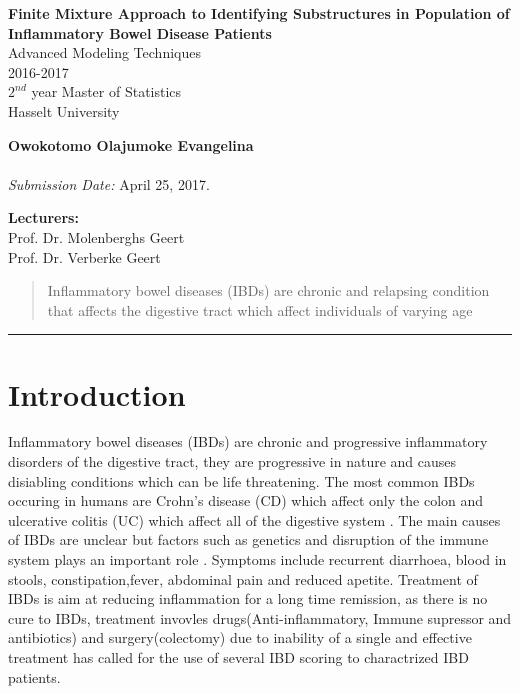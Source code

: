 \documentclass[11pt]{article}\usepackage[]{graphicx}\usepackage[]{color}
\begin{document}
\clearpage\thispagestyle{empty}

\begin{center}
	\textbf{\huge{Finite Mixture Approach to Identifying Substructures in Population of Inflammatory Bowel Disease Patients}} \\[1.7cm]
	\Large{
	Advanced Modeling Techniques\\
	2016-2017 \\[0.5cm]
	$2^{nd}$ year Master of Statistics \\
	Hasselt University	
	}
\end{center}

\vspace*{3cm}

\textbf{\large{Owokotomo Olajumoke Evangelina}}\\
 \\[2.5cm]

\noindent\textit{Submission Date:} April 25, 2017.

\vspace*{3cm}
\textbf{\large{Lecturers:}}\\
Prof. Dr. Molenberghs Geert  \\
Prof. Dr.  Verberke Geert


\newpage \setcounter{page}{1}

\begin{abstract}
Inflammatory bowel diseases (IBDs) are chronic and relapsing condition that affects the digestive tract which affect individuals of varying age
\end{abstract}
\rule{\textwidth}{0.4pt}

\newpage
\section*{Introduction}\label{introduction}
Inflammatory bowel diseases (IBDs) are chronic and progressive inflammatory disorders of the digestive tract, they are progressive in nature and causes disiabling conditions which can be life threatening. The most common IBDs occuring in humans are Crohn's disease (CD) which affect only the colon and ulcerative colitis (UC) which  affect all of the digestive system \cite{bib1}. The main causes of IBDs are unclear but factors such as genetics and disruption of the immune system plays an important role \cite{bib2}. Symptoms include recurrent diarrhoea, blood in stools, constipation,fever, abdominal pain and reduced apetite. Treatment of IBDs is aim at reducing inflammation for a long time remission, as there is no cure to IBDs, treatment invovles drugs(Anti-inflammatory, Immune supressor and antibiotics)  and surgery(colectomy) \cite{bib3} due to inability of a single and effective treatment has called for the use of several IBD scoring to charactrized IBD patients. 
\end{document}
